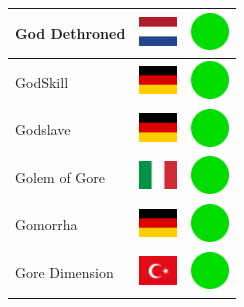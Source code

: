 \documentclass[12pt, a4paper, twoside]{report}
\begin{document}
\begin{center}
\begin{longtable}{|p{5cm}|p{2cm}|p{2cm}|}
 God Dethroned                                              & \includegraphics[width=1cm]{../img/flags/nl} &   \includegraphics[width=1cm]{../likes/y} \\ \hline
 GodSkill                                                   & \includegraphics[width=1cm]{../img/flags/de} &   \includegraphics[width=1cm]{../likes/y} \\ \hline
 Godslave                                                   & \includegraphics[width=1cm]{../img/flags/de} &   \includegraphics[width=1cm]{../likes/y} \\ \hline
 Golem of Gore                                              & \includegraphics[width=1cm]{../img/flags/it} &   \includegraphics[width=1cm]{../likes/y} \\ \hline
 Gomorrha                                                   & \includegraphics[width=1cm]{../img/flags/de} &   \includegraphics[width=1cm]{../likes/y} \\ \hline
 Gore Dimension                                             & \includegraphics[width=1cm]{../img/flags/tr} &   \includegraphics[width=1cm]{../likes/y} \\ \hline

\end{longtable}
\end{center}
\end{document}

